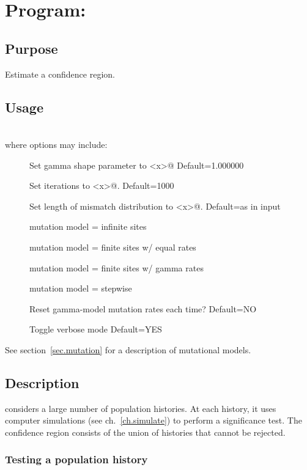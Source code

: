 \chapter{Program: \label{ch.mmci}}

\section{Purpose} Estimate a confidence region.

\section{Usage\label{sec.mmci.usage}} \\
where options may include:
\begin{description}
\item[] Set gamma shape parameter to \verb@<x>@ Default=1.000000
\item[] Set iterations to \verb@<x>@. Default=1000
\item[] Set length of mismatch distribution to
\verb@<x>@. Default=as in input  
\item[]   mutation model = infinite sites
\item[]   mutation model = finite sites w/ equal rates
\item[]   mutation model = finite sites w/ gamma rates
\item[]   mutation model = stepwise
\item[]    Reset gamma-model mutation rates each time? Default=NO
\item[]    Toggle verbose mode Default=YES
\end{description}
See section~\ref{sec.mutation} for a description of mutational models.

\section{Description}

 considers a large number of population histories.  At each
history, it uses computer simulations (see ch.~\ref{ch.simulate}) to
perform a significance test.  The confidence region consists of the
union of histories that cannot be rejected.

\subsection{Testing a population history\label{sec.mmci.test}}

